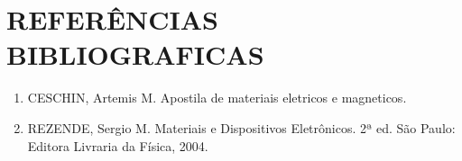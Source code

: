 \section{REFERÊNCIAS BIBLIOGRAFICAS}

{\small
\begin{enumerate}
   \item CESCHIN, Artemis M. Apostila de materiais eletricos e magneticos.
   \item REZENDE, Sergio M. Materiais e Dispositivos Eletrônicos. 2ª ed. São Paulo: Editora Livraria da Física, 2004.
\end{enumerate}
}